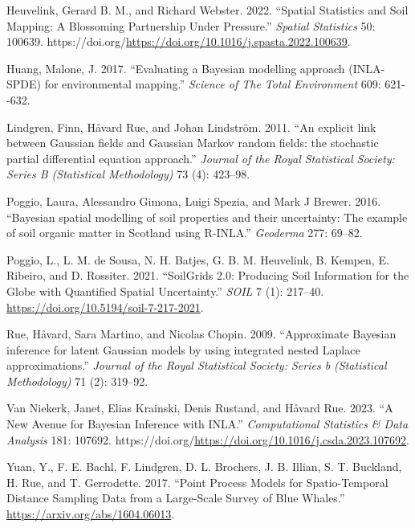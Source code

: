 \documentclass[
  a4paper,
]{article}
\newlength{\cslhangindent}
\newlength{\cslentryspacingunit} %
\newenvironment{CSLReferences}[2] %
 {%
  \setlength{\parindent}{0pt}
  \ifodd #1
  \let\oldpar\par
  \def\par{\hangindent=\cslhangindent\oldpar}
  \fi
  \setlength{\parskip}{#2\cslentryspacingunit}
 }%
 {}
\begin{document}
\hypertarget{refs}{}
\begin{CSLReferences}{1}{0}
\leavevmode{}%
Heuvelink, Gerard B. M., and Richard Webster. 2022. {``Spatial
Statistics and Soil Mapping: A Blossoming Partnership Under Pressure.''}
\emph{Spatial Statistics} 50: 100639.
https://doi.org/\url{https://doi.org/10.1016/j.spasta.2022.100639}.

\leavevmode{}%
Huang, Malone, J. 2017. {``{Evaluating a Bayesian modelling approach
(INLA-SPDE) for environmental mapping}.''} \emph{Science of The Total
Environment} 609: 621-\/-632.

\leavevmode{}%
Lindgren, Finn, Håvard Rue, and Johan Lindström. 2011. {``{An explicit
link between Gaussian fields and Gaussian Markov random fields: the
stochastic partial differential equation approach}.''} \emph{Journal of
the Royal Statistical Society: Series B (Statistical Methodology)} 73
(4): 423--98.

\leavevmode{}%
Poggio, Laura, Alessandro Gimona, Luigi Spezia, and Mark J Brewer. 2016.
{``{Bayesian spatial modelling of soil properties and their uncertainty:
The example of soil organic matter in Scotland using R-INLA}.''}
\emph{Geoderma} 277: 69--82.

\leavevmode{}%
Poggio, L., L. M. de Sousa, N. H. Batjes, G. B. M. Heuvelink, B. Kempen,
E. Ribeiro, and D. Rossiter. 2021. {``{SoilGrids} 2.0: Producing Soil
Information for the Globe with Quantified Spatial Uncertainty.''}
\emph{SOIL} 7 (1): 217--40.
\url{https://doi.org/10.5194/soil-7-217-2021}.

\leavevmode{}%
Rue, Håvard, Sara Martino, and Nicolas Chopin. 2009. {``{Approximate
Bayesian inference for latent Gaussian models by using integrated nested
Laplace approximations}.''} \emph{Journal of the Royal Statistical
Society: Series b (Statistical Methodology)} 71 (2): 319--92.

\leavevmode{}%
Van Niekerk, Janet, Elias Krainski, Denis Rustand, and Håvard Rue. 2023.
{``A New Avenue for Bayesian Inference with INLA.''} \emph{Computational
Statistics \& Data Analysis} 181: 107692.
https://doi.org/\url{https://doi.org/10.1016/j.csda.2023.107692}.

\leavevmode{}%
Yuan, Y., F. E. Bachl, F. Lindgren, D. L. Brochers, J. B. Illian, S. T.
Buckland, H. Rue, and T. Gerrodette. 2017. {``Point Process Models for
Spatio-Temporal Distance Sampling Data from a Large-Scale Survey of Blue
Whales.''} \url{https://arxiv.org/abs/1604.06013}.

\end{CSLReferences}
\end{document}

